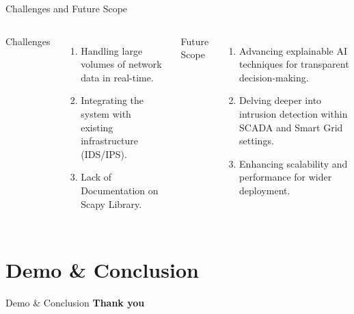 \documentclass{beamer}
\begin{document}
\begin{frame}{Challenges and Future Scope}
    \begin{columns}
        Challenges
        \begin{enumerate}
            \item Handling large volumes of network data in real-time.
            \item Integrating the system with existing infrastructure (IDS/IPS).
            \item Lack of Documentation on Scapy Library.
        \end{enumerate}
        Future Scope
        \begin{enumerate}
            \item Advancing explainable AI techniques for transparent decision-making.
            \item Delving deeper into intrusion detection within SCADA and Smart Grid settings.
            \item Enhancing scalability and performance for wider deployment.
        \end{enumerate}
        \end{columns}

\end{frame}

\section{Demo \& Conclusion}
\begin{frame}{Demo \& Conclusion}
    \huge{\textbf{Thank you}}
\end{frame}
\end{document}
